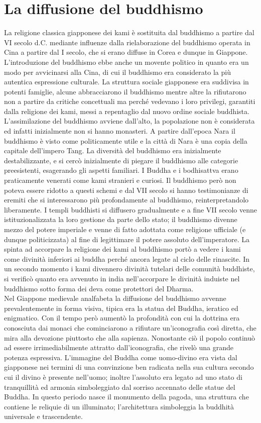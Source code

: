 \documentclass[10pt,a4paper]{report}
\begin{document}
\section{La diffusione del buddhismo}
La religione classica giapponese dei kami è sostituita dal buddhismo a partire dal VI secolo d.C. mediante influenze dalla rielaborazione del buddhismo operata in Cina a partire dal I secolo, che si erano diffuse in Corea e dunque in Giappone. L'introduzione del buddhismo ebbe anche un movente politico in quanto era un modo per avvicinarsi alla Cina, di cui il buddhismo era considerato la più autentica espressione culturale. La struttura sociale giapponese era suddivisa in potenti famiglie, alcune abbracciarono il buddhismo mentre altre la rifiutarono non a partire da critiche concettuali ma perché vedevano i loro privilegi, garantiti dalla religione dei kami, messi a repentaglio dal nuovo ordine sociale buddhista. L'assimilazione del buddhismo avviene dall'alto, la popolazione non è considerata ed infatti inizialmente non si hanno monasteri. A partire dall'epoca Nara il buddhismo è visto come politicamente utile e la città di Nara è una copia della capitale dell'impero Tang.
La diversità del buddhismo era inizialmente destabilizzante, e si cercò inizialmente di piegare il buddhismo alle categorie preesistenti, esagerando gli aspetti familiari. I Buddha e i bodhisattva erano praticamente venerati come kami stranieri e curiosi. Il buddhismo però non poteva essere ridotto a questi schemi e dal VII secolo si hanno testimonianze di eremiti che si interessarono più profondamente al buddhismo, reinterpretandolo liberamente. I templi buddhisti si diffusero gradualmente e a fine VII secolo venne istituzionalizzata la loro gestione da parte dello stato; il buddhismo divenne mezzo del potere imperiale e venne di fatto adottata come religione ufficiale (e dunque politicizzata) al fine di legittimare il potere assoluto dell'imperatore. La spinta ad accorpare la religione dei kami al buddhismo portò a vedere i kami come divinità inferiori ai buddha perché ancora legate al ciclo delle rinascite. In un secondo momento i kami divennero divinità tutelari delle comunità buddhiste, si verificò quanto era avvenuto in india nell'accorpare le divinità induiste nel buddhismo sotto forma dei deva come protettori del Dharma.\\
Nel Giappone medievale analfabeta la diffusione del buddhismo avvenne prevalentemente in forma visiva, tipica era la statua del Buddha, ieratico ed enigmatico. Con il tempo però aumentò la profondità con cui la dottrina era conosciuta dai monaci che cominciarono a rifiutare un'iconografia così diretta, che mira alla devozione piuttosto che alla sapienza. Nonostante ciò il popolo continuò ad essere irrimediabilmente attratto dall'iconografia, che rivelò una grande potenza espressiva. L'immagine del Buddha come uomo-divino era vista dal giapponese nei termini di una convinzione ben radicata nella sua cultura secondo cui il divino è presente nell'uomo; inoltre l'assoluto era legato ad uno stato di tranquillità ed armonia simboleggiato dal sorriso accennato delle statue del Buddha. In questo periodo nasce il monumento della pagoda, una struttura che contiene le reliquie di un illuminato; l'architettura simboleggia la buddhità universale e trascendente.\\
\end{document}
